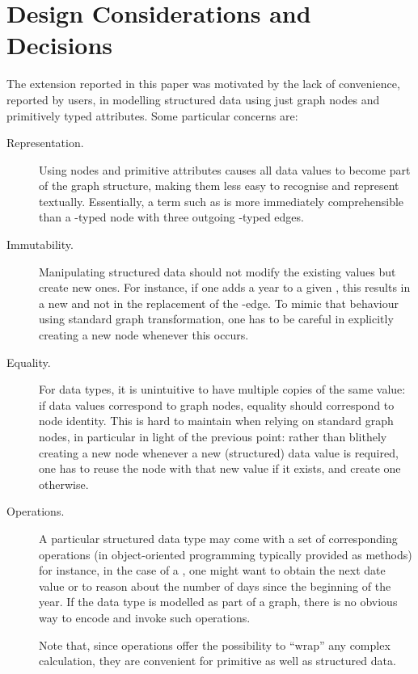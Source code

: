 \section{Design Considerations and Decisions}
\label{sec:philosophy}

The extension reported in this paper was motivated by the lack of convenience, reported by users, in modelling structured data using just graph nodes and primitively typed attributes. Some particular concerns are:

\begin{description}
\item[Representation.] Using nodes and primitive attributes causes all data values to become part of the graph structure, making them less easy to recognise and represent textually. Essentially, a term such as  is more immediately comprehensible than a -typed node with three outgoing -typed edges.

\item[Immutability.] Manipulating structured data should not modify the existing values but create new ones. For instance, if one adds a year to a given , this results in a new  and not in the replacement of the -edge. To mimic that behaviour using standard graph transformation, one has to be careful in explicitly creating a new node whenever this occurs.

\item[Equality.] For data types, it is unintuitive to have multiple copies of the same value: if data values correspond to graph nodes, equality should correspond to node identity. This is hard to maintain when relying on standard graph nodes, in particular in light of the previous point: rather than blithely creating a new node whenever a new (structured) data value is required, one has to reuse the node with that new value if it exists, and create one otherwise.

\item[Operations.] A particular structured data type may come with a set of corresponding operations (in object-oriented programming typically provided as methods) for instance, in the case of a , one might want to obtain the next date value or to reason about the number of days since the beginning of the year. If the data type is modelled as part of a graph, there is no obvious way to encode and invoke such operations.

\smallskip
Note that, since operations offer the possibility to ``wrap'' any complex calculation, they are convenient for primitive as well as structured data.
\end{description}
